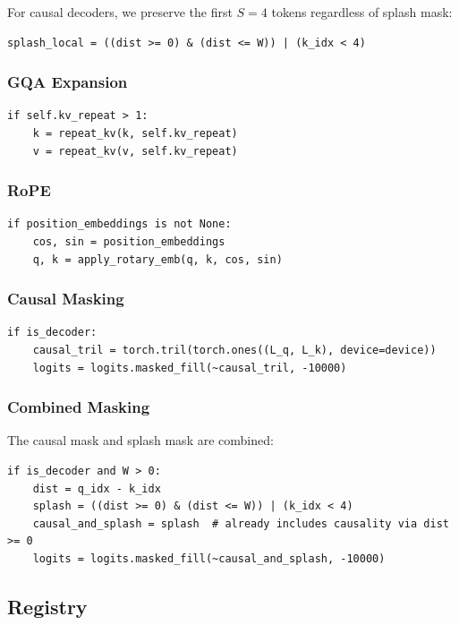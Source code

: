 For causal decoders, we preserve the first $S = 4$ tokens regardless of 
splash mask:

\begin{lstlisting}
splash_local = ((dist >= 0) & (dist <= W)) | (k_idx < 4)
\end{lstlisting}

\subsubsection{GQA Expansion}

\begin{lstlisting}
if self.kv_repeat > 1:
    k = repeat_kv(k, self.kv_repeat)
    v = repeat_kv(v, self.kv_repeat)
\end{lstlisting}

\subsubsection{RoPE}

\begin{lstlisting}
if position_embeddings is not None:
    cos, sin = position_embeddings
    q, k = apply_rotary_emb(q, k, cos, sin)
\end{lstlisting}

\subsubsection{Causal Masking}

\begin{lstlisting}
if is_decoder:
    causal_tril = torch.tril(torch.ones((L_q, L_k), device=device))
    logits = logits.masked_fill(~causal_tril, -10000)
\end{lstlisting}

\subsubsection{Combined Masking}

The causal mask and splash mask are combined:

\begin{lstlisting}
if is_decoder and W > 0:
    dist = q_idx - k_idx
    splash = ((dist >= 0) & (dist <= W)) | (k_idx < 4)
    causal_and_splash = splash  # already includes causality via dist >= 0
    logits = logits.masked_fill(~causal_and_splash, -10000)
\end{lstlisting}

\subsection{Registry}

